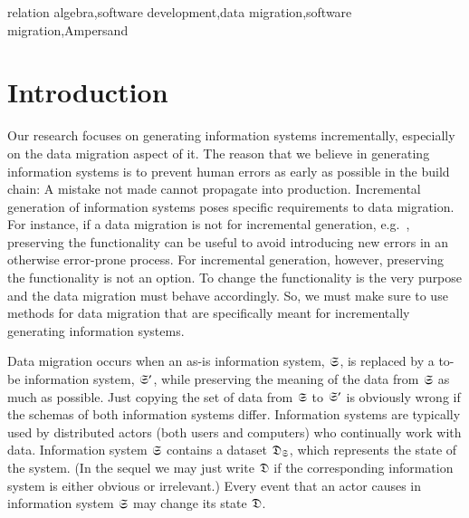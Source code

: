 \documentclass{elsarticle}
\begin{document}
\begin{keyword}
relation algebra\sep software development\sep data migration\sep software migration\sep Ampersand
\end{keyword}
\maketitle

\section{Introduction}
\label{sct:Introduction}
   Our research focuses on generating information systems incrementally,
   especially on the data migration aspect of it.
   The reason that we believe in generating information systems is to prevent human errors as early as possible in the build chain:
   A mistake not made cannot propagate into production.
   Incremental generation of information systems poses specific requirements to data migration.
   For instance, if a data migration is not for incremental generation,
   e.g.~\cite{Gholami2016,Bisbal1999},
   preserving the functionality can be useful to avoid introducing new errors in an otherwise error-prone process.
   For incremental generation, however, preserving the functionality is not an option.
   To change the functionality is the very purpose and the data migration must behave accordingly.
   So, we must make sure to use methods for data migration that are specifically meant for incrementally generating information systems.
   
   Data migration occurs when an as-is information system, $\mathfrak{S}$, is replaced by a to-be information system, $\mathfrak{S}'$,
   while preserving the meaning of the data from $\mathfrak{S}$ as much as possible.
   Just copying the set of data from $\mathfrak{S}$ to $\mathfrak{S}'$ is obviously wrong if the schemas of both information systems differ.
   Information systems are typically used by distributed actors (both users and computers) who continually work with data.
   Information system $\mathfrak{S}$ contains a dataset $\mathfrak{D}_{\mathfrak{S}}$, which represents the state of the system.
   (In the sequel we may just write $\mathfrak{D}$ if the corresponding information system is either obvious or irrelevant.)
   Every event that an actor causes in information system $\mathfrak{S}$ may change its state $\mathfrak{D}$.
\end{document}
